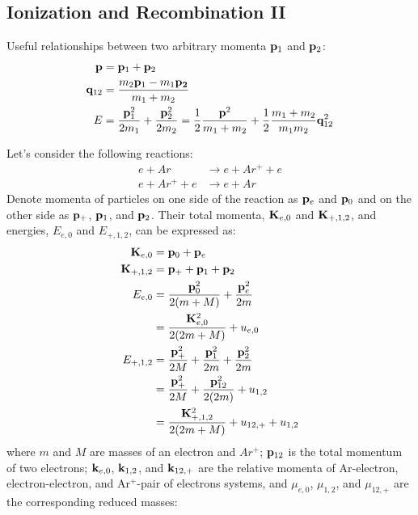 \documentclass{article}[draft]
\begin{document}
\newpage
\subsection{Ionization and Recombination II}

Useful relationships between two arbitrary momenta $\mathbf{p}_1$ and $\mathbf{p}_2$:
\begin{align*}
\mathbf{p} &= \mathbf{p}_1 + \mathbf{p}_2 
\\
\mathbf{q}_{12} &= \frac{m_2 \mathbf{p}_1 - m_1 \mathbf{p_2}}{m_1 + m_2}
\\
E &= \frac{\mathbf{p}_1^2}{2 m_1} + \frac{\mathbf{p}_2^2}{2 m_2} 
=
\frac12 \frac{\mathbf{p}^2}{m_1+m_2} + \frac12 \frac{m_1+m_2}{m_1 m_2} \mathbf{q}_{12}^2
\end{align*}

Let's consider the following reactions:
\begin{align*}
	e + Ar &\rightarrow e + Ar^{+} + e \\
	e + Ar^{+} + e &\rightarrow e + Ar
\end{align*}
Denote momenta of particles on one side of the reaction as $\mathbf{p}_e$ and $\mathbf{p}_0$ and on the other side as $\mathbf{p}_+$, $\mathbf{p}_1$, and $\mathbf{p}_2$. Their total momenta, $\mathbf{K}_{e,0}$ and $\mathbf{K}_{+,1,2}$, and energies, $E_{e,0}$ and $E_{+,1,2}$, can be expressed as:
\begin{align*}
\mathbf{K}_{e,0} &= \mathbf{p}_0 + \mathbf{p}_e
\\
\mathbf{K}_{+,1,2} &= \mathbf{p}_+ + \mathbf{p}_1 + \mathbf{p}_2
\\
E_{e,0} &= \frac{\mathbf{p}_0^2}{2(m+M)} + \frac{\mathbf{p}_e^2}{2m} 
\\
&= \frac{\mathbf{K}_{e,0}^2}{2(2m+M)} + u_{e,0}
\\
E_{+,1,2} &= \frac{\mathbf{p}_+^2}{2M} + \frac{\mathbf{p}_1^2}{2m} + \frac{\mathbf{p}_2^2}{2m}
\\
&= \frac{\mathbf{p}_+^2}{2M} + \frac{\mathbf{p}_{12}^2}{2(2m)} + u_{1,2}
\\
&= \frac{\mathbf{K}_{+,1,2}^2}{2(2m+M)} + u_{12,+} + u_{1,2}
\end{align*}
where $m$ and $M$ are masses of an electron and $Ar^+$; $\mathbf{p}_{12}$ is the total momentum of two electrons; $\mathbf{k}_{e,0}$, $\mathbf{k}_{1,2}$, and $\mathbf{k}_{12,+}$ are the relative momenta of Ar-electron, electron-electron, and Ar$^+$-pair of electrons systems, and $\mu_{e,0}$, $\mu_{1,2}$, and $\mu_{12,+}$ are the corresponding reduced masses:
\end{document}

